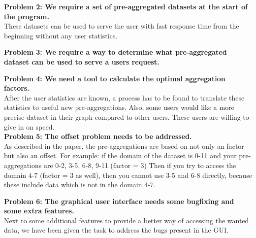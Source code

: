 \textbf{Problem 2: We require a set of pre-aggregated datasets at the start of the program.}\\
These datasets can be used to serve the user with fast response time from the beginning without any user statistics.

\textbf{Problem 3: We require a way to determine what pre-aggregated dataset can be used to serve a users request.}


\textbf{Problem 4: We need a tool to calculate the optimal aggregation factors.}\\
After the user statistics are known, a process has to be found to translate these statistics to useful new pre-aggregations. Also, some users would like a more precise dataset in their graph compared to other users. These users are willing to give in on speed.\\

\textbf{Problem 5: The offset problem needs to be addressed.}\\
As described in the paper\cite{wombacher2011}, the pre-aggregations are based on not only an factor but also an offset. For example: if the domain of the dataset is 0-11 and your pre-aggregations are 0-2, 3-5, 6-8, 9-11 (factor = 3) Then if you try to access the domain 4-7 (factor = 3 as well), then you cannot use 3-5 and 6-8 directly, because these include data which is not in the domain 4-7. 

\textbf{Problem 6: The graphical user interface needs some bugfixing and some extra features.}\\
Next to some additional features to provide a better way of accessing the wanted data, we have been given the task to address the bugs present in the GUI.
